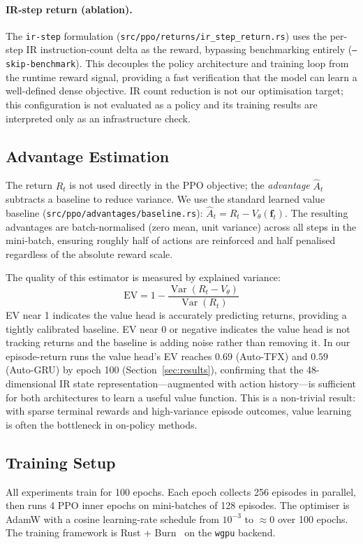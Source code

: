\documentclass[conference]{IEEEtran}
\begin{document}
\paragraph{IR-step return (ablation).}
The \texttt{ir-step} formulation
(\texttt{src/ppo/returns/ir\_step\_return.rs}) uses the per-step IR
instruction-count delta as the reward, bypassing benchmarking entirely
(\texttt{--skip-benchmark}).
This decouples the policy architecture and training loop from the runtime
reward signal, providing a fast verification that the model can learn a
well-defined dense objective.
IR count reduction is not our optimisation target; this configuration
is not evaluated as a policy and its training results are interpreted
only as an infrastructure check.

\subsection{Advantage Estimation}
\label{sec:advantages}
The return $R_t$ is not used directly in the PPO objective; the
\emph{advantage} $\hat{A}_t$ subtracts a baseline to reduce variance.
We use the standard learned value baseline
(\texttt{src/ppo/advantages/baseline.rs}):
$\hat{A}_t = R_t - V_\theta(\mathbf{f}_t)$.
The resulting advantages are batch-normalised (zero mean, unit variance)
across all steps in the mini-batch, ensuring roughly half of actions are
reinforced and half penalised regardless of the absolute reward scale.

The quality of this estimator is measured by explained variance:
%
\begin{equation}
\text{EV} = 1 - \frac{\operatorname{Var}(R_t - V_\theta)}{\operatorname{Var}(R_t)}
\label{eq:ev}
\end{equation}
%
EV near 1 indicates the value head is accurately predicting returns,
providing a tightly calibrated baseline.
EV near 0 or negative indicates the value head is not tracking returns and
the baseline is adding noise rather than removing it.
In our episode-return runs the value head's EV reaches $0.69$ (Auto-TFX)
and $0.59$ (Auto-GRU) by epoch 100 (Section~\ref{sec:results}), confirming
that the 48-dimensional IR state representation---augmented with action
history---is sufficient for both architectures to learn a useful value function.
This is a non-trivial result: with sparse terminal rewards and high-variance
episode outcomes, value learning is often the bottleneck in on-policy methods.

\subsection{Training Setup}
All experiments train for 100 epochs.
Each epoch collects 256 episodes in parallel, then runs 4 PPO inner epochs
on mini-batches of 128 episodes.
The optimiser is AdamW with a cosine learning-rate schedule from $10^{-3}$
to $\approx 0$ over 100 epochs.
The training framework is Rust + Burn~\cite{burn} on the \texttt{wgpu}
backend.
\end{document}
